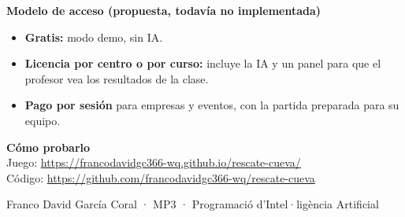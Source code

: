 \documentclass[11pt,a4paper]{article}
\begin{document}
\textbf{Modelo de acceso (propuesta, todavía no implementada)}
\begin{itemize}
\item \textbf{Gratis:} modo demo, sin IA.
\item \textbf{Licencia por centro o por curso:} incluye la IA y un panel para que el profesor vea los resultados de la clase.
\item \textbf{Pago por sesión} para empresas y eventos, con la partida preparada para su equipo.
\end{itemize}

\textbf{Cómo probarlo}\\
Juego: \url{https://francodavidgc366-wq.github.io/rescate-cueva/}\\
Código: \url{https://github.com/francodavidgc366-wq/rescate-cueva}

\vspace{2pt}
{\small Franco David García Coral · MP3 · Programació d'Intel·ligència Artificial}
\end{document}
